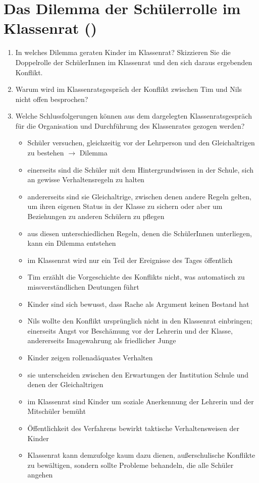 \newpage
\section{Das Dilemma der Schülerrolle im Klassenrat (\cite{HB10})}
\begin{enumerate}
	\item{
		In welches Dilemma geraten Kinder im Klassenrat?
		Skizzieren Sie die Doppelrolle der SchülerInnen im Klassenrat und den sich daraus ergebenden Konflikt.
	}
	\item{Warum wird im Klassenratsgespräch der Konflikt zwischen Tim und Nils nicht \glqq offen\grqq{} besprochen?}
	\item{
		Welche Schlussfolgerungen können aus dem dargelegten Klassenratsgespräch für die Organisation und Durchführung des Klassenrates gezogen werden?
		\begin{itemize}
			\item{Schüler versuchen, gleichzeitig vor der Lehrperson und den Gleichaltrigen zu bestehen $\rightarrow$ Dilemma}
			\item{einerseits sind die Schüler mit dem Hintergrundwissen in der Schule, sich an gewisse Verhaltensregeln zu halten}
			\item{andererseits sind sie Gleichaltrige, zwischen denen andere Regeln gelten, um ihren eigenen Status in der Klasse zu sichern oder aber um Beziehungen zu anderen Schülern zu pflegen}
			\item{aus diesen unterschiedlichen Regeln, denen die SchülerInnen unterliegen, kann ein Dilemma entstehen}
			\item{im Klassenrat wird nur ein Teil der Ereignisse des Tages öffentlich}
			\item{Tim erzählt die Vorgeschichte des Konflikts nicht, was automatisch zu missverständlichen Deutungen führt}
			\item{Kinder sind sich bewusst, dass Rache als Argument keinen Bestand hat}
			\item{Nils wollte den Konflikt ursprünglich nicht in den Klassenrat einbringen; einerseits Angst vor Beschämung vor der Lehrerin und der Klasse, andererseits Imagewahrung als friedlicher Junge}
			\item{Kinder zeigen rollenadäquates Verhalten}
			\item{sie unterscheiden zwischen den Erwartungen der Institution Schule und denen der Gleichaltrigen}
			\item{im Klassenrat sind Kinder um soziale Anerkennung der Lehrerin und der Mitschüler bemüht}
			\item{Öffentlichkeit des Verfahrens bewirkt taktische Verhaltensweisen der Kinder}
			\item{Klassenrat kann demzufolge kaum dazu dienen, außerschulische Konflikte zu bewältigen, sondern sollte Probleme behandeln, die alle Schüler angehen}
		\end{itemize}
	}
\end{enumerate}

